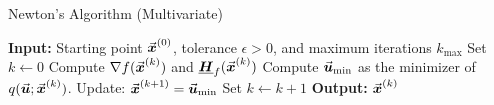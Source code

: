 


\begin{algorithm}[H]
  \caption{Newton's Algorithm (Multivariate)}
  \label{alg:newton_multivariate}
  \begin{algorithmic}[1]
      \State \textbf{Input:} Starting point \(\vec{\boldsymbol{x}}^{(0)}\), tolerance \(\epsilon>0\), and maximum iterations \(k_{\max}\)
      \State Set \(k \gets 0\)
          \State Compute \(\nabla f(\vec{\boldsymbol{x}}^{(k)})\) and \(\underline{\boldsymbol{H}}_f(\vec{\boldsymbol{x}}^{(k)})\)
          \State Compute \(\vec{\boldsymbol{u}}_{\min}\) as the minimizer of \(q(\vec{\boldsymbol{u}};\vec{\boldsymbol{x}}^{(k)})\).\label{alg:line:calculate_newton_direction} 
          \State Update: \(\vec{\boldsymbol{x}}^{(k+1)}=\vec{\boldsymbol{u}}_{\min}\) 
          \State Set \(k\gets k+1\)
      \EndWhile
      \State \textbf{Output:} \(\vec{\boldsymbol{x}}^{(k)}\)
  \end{algorithmic}
\end{algorithm}

